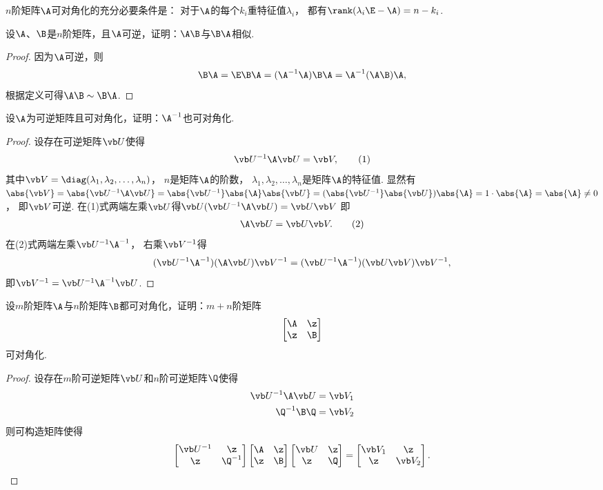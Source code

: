 \begin{corollary}\label{theorem:矩阵可对角化的充分必要条件.定理3}
\(n\)阶矩阵\(\A\)可对角化的充分必要条件是：
对于\(\A\)的每个\(k_i\)重特征值\(\lambda_i\)，
都有\(\rank(\lambda_i\E-\A) = n-k_i\).
\end{corollary}

\begin{example}
设\(\A\)、\(\B\)是\(n\)阶矩阵，且\(\A\)可逆，证明：\(\A\B\)与\(\B\A\)相似.
\begin{proof}
因为\(\A\)可逆，则\[
	\B\A
	=\E\B\A
	=(\A^{-1}\A)\B\A
	=\A^{-1}(\A\B)\A,
\]
根据定义可得\(\A\B \sim \B\A\).
\end{proof}
\end{example}

\begin{example}
设\(\A\)为可逆矩阵且可对角化，证明：\(\A^{-1}\)也可对角化.
\begin{proof}
设存在可逆矩阵\(\P\)使得\begin{gather}
	\P^{-1}\A\P = \V,
	\tag1
\end{gather}
其中\(\V=\diag(\lambda_1,\lambda_2,\dotsc,\lambda_n)\)，
\(n\)是矩阵\(\A\)的阶数，
\(\lambda_1,\lambda_2,\dotsc,\lambda_n\)是矩阵\(\A\)的特征值.
显然有\(\abs{\V}
= \abs{\P^{-1}\A\P}
= \abs{\P^{-1}}\abs{\A}\abs{\P}
= (\abs{\P^{-1}}\abs{\P})\abs{\A}
= 1 \cdot \abs{\A}
= \abs{\A} \neq 0\)，
即\(\V\)可逆.
在(1)式两端左乘\(\P\)得\(\P(\P^{-1}\A\P) = \P\V\)
即\begin{gather}
	\A\P = \P\V.
	\tag2
\end{gather}
在(2)式两端左乘\(\P^{-1}\A^{-1}\)，
右乘\(\V^{-1}\)得\[
	(\P^{-1}\A^{-1})(\A\P)\V^{-1} = (\P^{-1}\A^{-1})(\P\V)\V^{-1},
\]
即\(\V^{-1} = \P^{-1}\A^{-1}\P\).
\end{proof}
\end{example}

\begin{example}
设\(m\)阶矩阵\(\A\)与\(n\)阶矩阵\(\B\)都可对角化，证明：\(m+n\)阶矩阵\[
	\begin{bmatrix} \A & \z \\ \z & \B \end{bmatrix}
\]可对角化.
\begin{proof}
设存在\(m\)阶可逆矩阵\(\P\)和\(n\)阶可逆矩阵\(\Q\)使得
\begin{align*}
	\P^{-1}\A\P &= \V_1 \\
	\Q^{-1}\B\Q &= \V_2
\end{align*}
则可构造矩阵使得\[
	\begin{bmatrix}
		\P^{-1} & \z \\
		\z & \Q^{-1}
	\end{bmatrix}
	\begin{bmatrix} \A & \z \\ \z & \B \end{bmatrix}
	\begin{bmatrix}
		\P & \z \\
		\z & \Q
	\end{bmatrix}
	= \begin{bmatrix}
		\V_1 & \z \\
		\z & \V_2
	\end{bmatrix}.
	\qedhere
\]
\end{proof}
\end{example}

